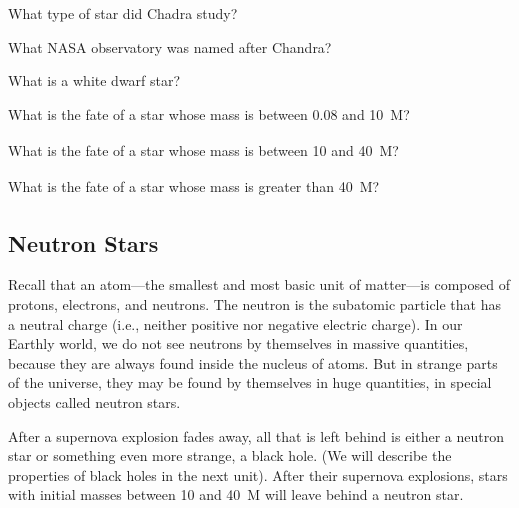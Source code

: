 \documentclass{article}
\numberwithin{equation}{section}
\numberwithin{figure}{section}
\begin{document}
\begin{exercise}
    What type of star did Chadra study?
\end{exercise}

\begin{exercise}
    What NASA observatory was named after Chandra?
\end{exercise}

\begin{exercise}
    What is a white dwarf star?
\end{exercise}

\begin{exercise}
    What is the fate of a star whose mass is between 0.08 and \SI{10}{M_{\odot}}?
\end{exercise}

\begin{exercise}
    What is the fate of a star whose mass is between 10 and \SI{40}{M_{\odot}}?
\end{exercise}

\begin{exercise} \label{P4iquu}
    What is the fate of a star whose mass is greater than \SI{40}{M_{\odot}}?
\end{exercise}

\subsection{Neutron Stars}

Recall that an atom---the smallest and most basic unit of matter---is composed of protons, electrons, and neutrons. The neutron is the subatomic particle that has a neutral charge (i.e., neither positive nor negative electric charge). In our Earthly world, we do not see neutrons by themselves in massive quantities, because they are always found inside the nucleus of atoms. But in strange parts of the universe, they may be found by themselves in huge quantities, in special objects called neutron stars.
\vspace{1em}

After a supernova explosion fades away, all that is left behind is either a neutron star or something even more strange, a black hole. (We will describe the properties of black holes in the next unit). After their supernova explosions, stars with initial masses between 10 and \SI{40}{M_{\odot}} will leave behind a neutron star.
\vspace{1em}
\end{document}
